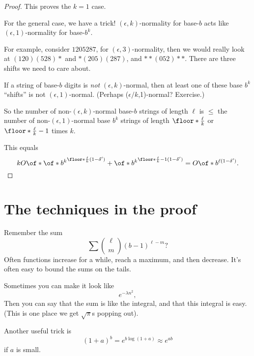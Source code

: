 \documentclass{article}
\begin{document}
\begin{proof}
    This proves the $k=1$ case.

    For the general case, we have a trick!
    $(\epsilon,k)$-normality for base-$b$ 
    acts like $(\epsilon,1)$-normality for 
    base-$b^k$.

    For example, consider 
    $1205287$, for $(\epsilon,3)$-normality, 
    then we would really look at 
    $(120)(528)*$ and $*(205)(287)$, and 
    $**(052)**$. There are three shifts we need to
    care about.

    If a string of base-$b$ digits is \emph{not}
    $(\epsilon,k)$-normal, then at least one of 
    these base $b^k$ ``shifts'' is not 
    $(\epsilon,1)$-normal. 
    (Perhaps ($\epsilon/k$,1)-normal? Exercise.)

    So the number of non-$(\epsilon,k)$-normal 
    base-$b$ strings of length $\ell$ is 
    $\le$ the number of non-$(\epsilon,1)$-normal
    base $b^k$ strings of length 
    $\floor*{\frac{\ell}{k}}$ or $\floor*{\frac{\ell}{k}}-1$
    times $k$.

    This equals 
    \[ k O\of*{
        \of*{
            b^k
        }^{
            \floor*{
                \frac{\ell}{k}
            }(1-\delta')
        }
        +
        \of*{
            b^k
        }^{
            \floor*{
                \frac{\ell}{k}
                -1
            }(1-\delta')
        }
    }
    = O\of*{b^{\ell(1-\delta')}}.
    \]

\end{proof}

\section{The techniques in the proof}

Remember the sum 
\[\sum \binom{\ell}{m} (b-1)^{\ell-m}? \]
Often functions increase for a while, reach a 
maximum, and then decrease. It's often
easy to bound the sums on the tails.

Sometimes you can make it look like 
\[e^{-\lambda n^2},\]
Then you can say that the sum is like the integral,
and that this integral is easy. (This is one place
we get $\sqrt{\pi}$s popping out).

Another useful trick is 
\[(1+a)^b = e^{b\log (1+a)} \approx e^{ab} \]
if $a$ is small.
\end{document}
